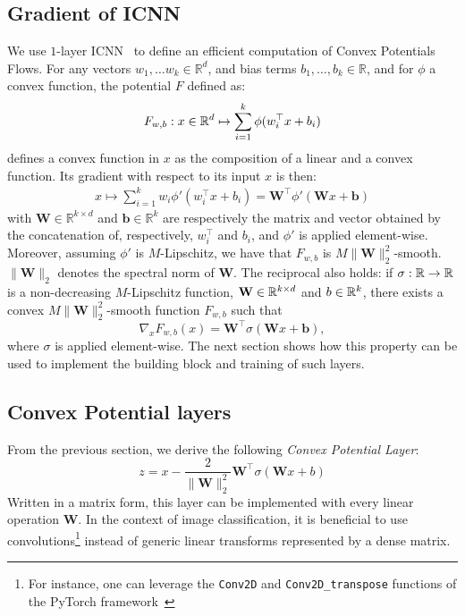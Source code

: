 \subsection{Gradient of ICNN}
We use $1$-layer ICNN~\citep{amos2017input} to define an efficient computation of Convex Potentials Flows. For any vectors $w_1,\dots w_k\in\mathbb{R}^d$, and bias terms  $b_1,\dots,b_k\in \mathbb{R}$, and for $\phi$ a convex function,  the potential $F$ defined as:
\begin{align*}
    F_{w,b}:x\in\mathbb{R}^d\mapsto \sum_{i=1}^k\phi( w_i^\top x+b_i)
\end{align*}
defines  a convex function in $x$ as the composition of a linear and a convex function. Its gradient with respect to its input $x$ is then:
\begin{align*}
    x\mapsto \sum_{i=1}^kw_i\phi'(w_i^\top x+b_i) = \mathbf{W}^\top \phi'(\mathbf{W} x+\mathbf{b})
\end{align*}
with $\mathbf{W}\in \mathbb{R}^{k\times d}$ and $\mathbf{b}\in\mathbb{R}^{k}$ are respectively the matrix and vector obtained by the concatenation of, respectively, $w_i^\top$ and $b_i$, and $\phi'$ is applied element-wise.  
Moreover, assuming $\phi'$ is $M$-Lipschitz, we have that $F_{w,b}$ is  $M\lVert\mathbf{W}\rVert_2^2$-smooth. $\lVert\mathbf{W}\rVert_2$ denotes the spectral norm of $\mathbf{W}$.
The reciprocal also holds: if $\sigma:\mathbb{R}\to\mathbb{R}$ is a non-decreasing $M$-Lipschitz function, $\mathbf{W}\in \mathbb{R}^{k\times d}$ and $b\in \mathbb{R}^{k}$, there exists a convex $M\lVert\mathbf{W}\rVert_2^2$-smooth function $F_{w,b}$ such that 
$$\nabla_xF_{w,b}(x) =  \mathbf{W}^\top \sigma(\mathbf{W} x+\mathbf{b}),$$ where $\sigma$ is applied element-wise. The next section shows how this property can be used to implement the building block and training of such layers. 


\subsection{Convex Potential layers}
From the previous section, we derive the following \emph{Convex Potential Layer}: 
\begin{equation*}
\label{equation:stable_block}
  z = x - \frac{2}{\lVert \mathbf{W} \lVert_2^2} \mathbf{W}^\top \sigma(\mathbf{W} x + b)
\end{equation*}
Written in a matrix form, this layer can be implemented with every linear operation $\mathbf{W}$.
In the context of image classification, it is beneficial to use convolutions\footnote{For instance, one can leverage the \texttt{Conv2D} and \texttt{Conv2D\_transpose} functions of the PyTorch framework~\citep{paszke2019pytorch}} instead of generic linear transforms represented by a dense matrix. 

